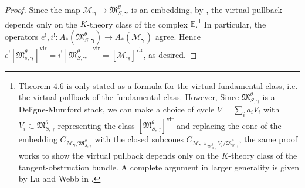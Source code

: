 \documentclass[12pt, oneside]{amsart}   	%
\newcommand{\vir}{\operatorname{vir}}
\numberwithin{equation}{section}
\numberwithin{thm}{section}
\numberwithin{figure}{section}
\begin{document}
\begin{proof}
%
%







Since the map $\mathscr{M}_{\pmb\gamma} \rightarrow \mathfrak{M}^\theta_{S,\pmb\gamma}$ is an embedding, by \cite[Theorem $4.6$]{globnc}, the virtual pullback depends only on the $K$-theory class of the complex $\mathbb{E}$.\footnote{Theorem $4.6$ is only stated as a formula for the virtual fundamental class, i.e. the virtual pullback of the fundamental class. However, Since $\mathfrak{M}_{S,\gamma}^{\theta}$ is a Deligne-Mumford stack, we can make a choice of cycle $V = \sum_i a_i V_i$ with $V_i \subset \mathfrak{M}_{S,\gamma}^{\theta}$ representing the class $[\mathfrak{M}_{S,\gamma}^{\theta}]^{\vir}$ and replacing the cone of the embedding $C_{\mathscr{M}_{\pmb\gamma}/\mathfrak{M}^{\theta}_{S,\gamma}}$ with the closed subcones $C_{\mathscr{M}_{\pmb\gamma}\times_{\mathfrak{M}^{\theta}_{S,\gamma}} V_i/\mathfrak{M}^{\theta}_{S,\gamma}}$, the same proof works to show the virtual pullback depends only on the $K$-theory class of the tangent-obstruction bundle. A complete argument in larger generality is given by Lu and Webb in \cite{relvpull}.} In particular, the operators $e^!,i^!: A_*(\mathfrak{M}_{S,\pmb\gamma}^{\theta}) \rightarrow A_*(\mathscr{M}_{\pmb\gamma})$ agree. Hence $e^![\mathfrak{M}^{\theta}_{s,\pmb\gamma}]^{\vir} = i^![\mathfrak{M}^{\theta}_{S,\pmb\gamma}]^{\vir} = [\mathscr{M}_{\pmb\gamma}]^{\vir}$, as desired. 





\end{proof}
\end{document}

